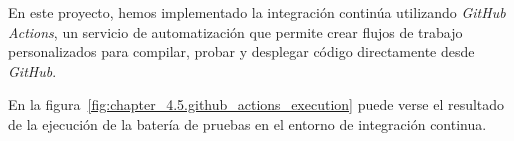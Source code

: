 En este proyecto, hemos implementado la integración continúa utilizando \textit{GitHub Actions}, un servicio de
automatización que permite crear flujos de trabajo personalizados para compilar, probar y desplegar código directamente
desde \textit{GitHub}.

En la figura~\ref{fig:chapter_4.5.github_actions_execution} puede verse el resultado de la ejecución de la batería de
pruebas en el entorno de integración continua.